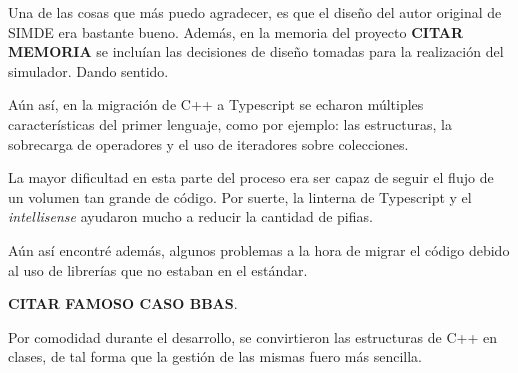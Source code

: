 Una de las cosas que más puedo agradecer, es que el diseño del autor original de SIMDE era bastante 
bueno. Además, en la memoria del proyecto \textbf{CITAR MEMORIA} se incluían las decisiones de diseño
tomadas para la realización del simulador. Dando sentido.

\bigskip
Aún así, en la migración de C++ a Typescript se echaron múltiples características del primer lenguaje,
como por ejemplo: las estructuras,  la sobrecarga de operadores y el uso de iteradores sobre colecciones.

\bigskip
La mayor dificultad en esta parte del proceso era ser capaz de seguir el flujo de un volumen tan grande
de código. Por suerte, la linterna de Typescript y el \textit{intellisense} ayudaron mucho a reducir la cantidad
de pifias.

\bigskip
Aún así encontré además, algunos problemas a la hora de migrar el código debido al uso de librerías 
que no estaban en el estándar.

\textbf{CITAR FAMOSO CASO BBAS}.

\bigskip
Por comodidad durante el desarrollo, se convirtieron las estructuras de C++ en clases, de tal forma
que la gestión de las mismas fuero más sencilla.